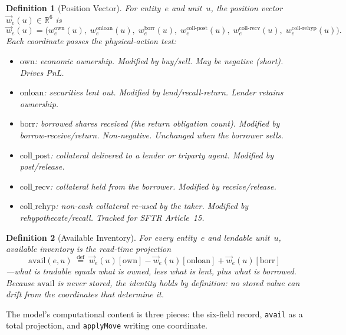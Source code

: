 \documentclass[11pt,a4paper]{article}
\newtheorem{definition}{Definition}[section]
\begin{document}
\begin{definition}[Position Vector]
\label{def:position-vector-gpm}
For entity~$e$ and unit~$u$, the position vector $\vec{w}_e(u) \in \mathbb{R}^6$ is
\[
\vec{w}_e(u) = \bigl(
  w^{\mathrm{own}}_e(u),\;
  w^{\mathrm{onloan}}_e(u),\;
  w^{\mathrm{borr}}_e(u),\;
  w^{\mathrm{coll\text{-}post}}_e(u),\;
  w^{\mathrm{coll\text{-}recv}}_e(u),\;
  w^{\mathrm{coll\text{-}rehyp}}_e(u)
\bigr).
\]
Each coordinate passes the physical-action test:
\begin{itemize}[nosep]
\item $\mathrm{own}$: economic ownership. Modified by buy/sell. May be negative (short). Drives PnL.
\item $\mathrm{onloan}$: securities lent out. Modified by lend\slash recall-return. Lender retains ownership.
\item $\mathrm{borr}$: borrowed shares received (the return obligation count). Modified by borrow-receive\slash return. Non-negative. Unchanged when the borrower sells.
\item $\mathrm{coll\_post}$: collateral delivered to a lender or triparty agent. Modified by post\slash release.
\item $\mathrm{coll\_recv}$: collateral held from the borrower. Modified by receive\slash release.
\item $\mathrm{coll\_rehyp}$: non-cash collateral re-used by the taker. Modified by rehypothecate/recall. Tracked for SFTR Article~15.
\end{itemize}
\end{definition}

\begin{definition}[Available Inventory]
\label{def:avail-projection}
For every entity~$e$ and lendable unit~$u$, available inventory is the read-time projection
\[
\mathrm{avail}(e,u) \;\stackrel{\mathrm{def}}{=}\; \vec{w}_e(u)[\mathrm{own}] - \vec{w}_e(u)[\mathrm{onloan}] + \vec{w}_e(u)[\mathrm{borr}]
\]
---what is tradable equals what is owned, less what is lent, plus what is borrowed. Because $\mathrm{avail}$ is never stored, the identity holds by definition: no stored value can drift from the coordinates that determine it.
\end{definition}

The model's computational content is three pieces: the six-field record, \verb|avail| as a total projection, and \verb|applyMove| writing one coordinate.
\end{document}
